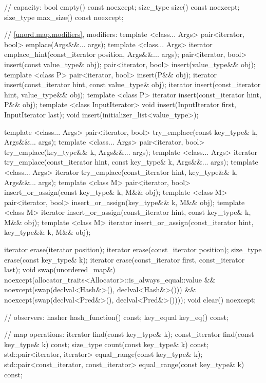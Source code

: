 \begin{codeblock}
{{    // capacity:
    bool      empty() const noexcept;
    size_type size() const noexcept;
    size_type max_size() const noexcept;

    // \ref{unord.map.modifiers}, modifiers:
    template <class... Args> pair<iterator, bool> emplace(Args&&... args);
    template <class... Args> iterator emplace_hint(const_iterator position, Args&&... args);
    pair<iterator, bool> insert(const value_type& obj);
    pair<iterator, bool> insert(value_type&& obj);
    template <class P> pair<iterator, bool> insert(P&& obj);
    iterator       insert(const_iterator hint, const value_type& obj);
    iterator       insert(const_iterator hint, value_type&& obj);
    template <class P> iterator insert(const_iterator hint, P&& obj);
    template <class InputIterator> void insert(InputIterator first, InputIterator last);
    void insert(initializer_list<value_type>);

    template <class... Args>
      pair<iterator, bool> try_emplace(const key_type& k, Args&&... args);
    template <class... Args>
      pair<iterator, bool> try_emplace(key_type&& k, Args&&... args);
    template <class... Args>
      iterator try_emplace(const_iterator hint, const key_type& k, Args&&... args);
    template <class... Args>
      iterator try_emplace(const_iterator hint, key_type&& k, Args&&... args);
    template <class M>
      pair<iterator, bool> insert_or_assign(const key_type& k, M&& obj);
    template <class M>
      pair<iterator, bool> insert_or_assign(key_type&& k, M&& obj);
    template <class M>
      iterator insert_or_assign(const_iterator hint, const key_type& k, M&& obj);
    template <class M>
      iterator insert_or_assign(const_iterator hint, key_type&& k, M&& obj);

    iterator  erase(iterator position);
    iterator  erase(const_iterator position);
    size_type erase(const key_type& k);
    iterator  erase(const_iterator first, const_iterator last);
    void      swap(unordered_map&)
      noexcept(allocator_traits<Allocator>::is_always_equal::value &&
               noexcept(swap(declval<Hash&>(), declval<Hash&>())) &&
               noexcept(swap(declval<Pred&>(), declval<Pred&>())));
    void      clear() noexcept;

    // observers:
    hasher hash_function() const;
    key_equal key_eq() const;

    // map operations:
    iterator       find(const key_type& k);
    const_iterator find(const key_type& k) const;
    size_type      count(const key_type& k) const;
    std::pair<iterator, iterator>             equal_range(const key_type& k);
    std::pair<const_iterator, const_iterator> equal_range(const key_type& k) const;

}}
\end{codeblock}
